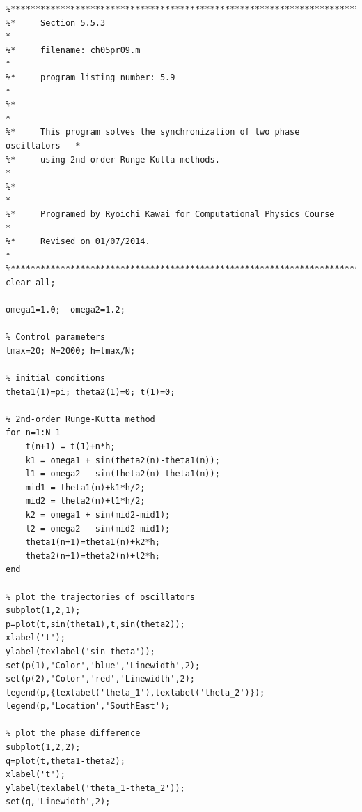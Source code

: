 \footnotesize
\begin{verbatim}
%**************************************************************************
%*     Section 5.5.3                                                      *
%*     filename: ch05pr09.m                                               *
%*     program listing number: 5.9                                        *
%*                                                                        *
%*     This program solves the synchronization of two phase oscillators   *
%*     using 2nd-order Runge-Kutta methods.                               *
%*                                                                        *
%*     Programed by Ryoichi Kawai for Computational Physics Course        *
%*     Revised on 01/07/2014.                                             *
%**************************************************************************
clear all;

omega1=1.0;  omega2=1.2;

% Control parameters
tmax=20; N=2000; h=tmax/N;

% initial conditions
theta1(1)=pi; theta2(1)=0; t(1)=0;

% 2nd-order Runge-Kutta method
for n=1:N-1
    t(n+1) = t(1)+n*h;
    k1 = omega1 + sin(theta2(n)-theta1(n));
    l1 = omega2 - sin(theta2(n)-theta1(n));
    mid1 = theta1(n)+k1*h/2;
    mid2 = theta2(n)+l1*h/2;
    k2 = omega1 + sin(mid2-mid1);
    l2 = omega2 - sin(mid2-mid1);
    theta1(n+1)=theta1(n)+k2*h;
    theta2(n+1)=theta2(n)+l2*h;
end

% plot the trajectories of oscillators
subplot(1,2,1); 
p=plot(t,sin(theta1),t,sin(theta2));
xlabel('t');
ylabel(texlabel('sin theta'));
set(p(1),'Color','blue','Linewidth',2);
set(p(2),'Color','red','Linewidth',2);
legend(p,{texlabel('theta_1'),texlabel('theta_2')});
legend(p,'Location','SouthEast');

% plot the phase difference
subplot(1,2,2);
q=plot(t,theta1-theta2);
xlabel('t');
ylabel(texlabel('theta_1-theta_2'));
set(q,'Linewidth',2);
\end{verbatim}
\normalsize



\bigskip
\noindent
\program\label{prog:period}

